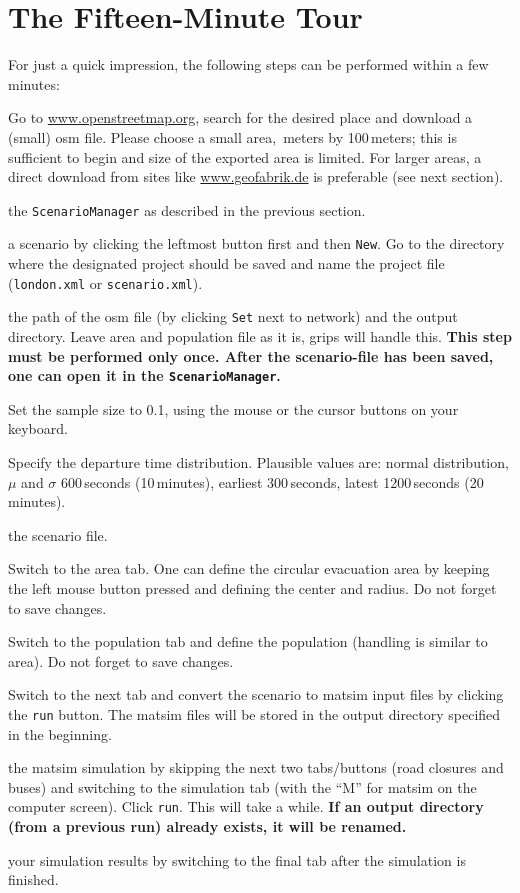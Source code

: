 \section{The Fifteen-Minute Tour}
\label{evac:section:fifteenminute}
For just a quick impression, the following steps can be performed within a few minutes:
\begin{description}\styleDescription
\item[OSM] Go to \url{www.openstreetmap.org}, search for the desired place and download a (small) \gls{osm} file. Please choose a small area, \,meters by 100\,meters; this is sufficient to begin and size of the exported area is limited. For larger areas, a direct download from sites like \url{www.geofabrik.de} is preferable (see next section).
\item[Run] the \lstinline|ScenarioManager| as described in the previous section.
\item[Create] a scenario by clicking the leftmost button first and then \lstinline|New|. Go to the directory where the designated project should be saved and name the project file (\eg \lstinline|london.xml| or \lstinline|scenario.xml|).
\item[Specify] the path of the \gls{osm} file (by clicking \lstinline|Set| next to network) and the output directory. Leave area and population file as it is, \gls{grips} will handle this.
\textbf{This step must be performed only once. After the scenario-file has been saved, one can open it in the \lstinline|ScenarioManager|.}
\item[Sample size] Set the sample size to 0.1, using the mouse or the cursor buttons on your keyboard.
\item[Departure] Specify the departure time distribution. Plausible values are: normal distribution, $\mu$ and $\sigma$ 600\,seconds (10\,minutes), earliest 300\,seconds, latest 1200\,seconds (20\,minutes).
\item[Save] the scenario file.
\item[Area] Switch to the area tab. One can define the circular evacuation area by keeping the left mouse button pressed and defining the center and radius. Do not forget to save changes.
\item[Population] Switch to the population tab and define the population (handling is similar to area). Do not forget to save changes.
\item[Convert] Switch to the next tab and convert the scenario to \gls{matsim} input files by clicking the \lstinline|run| button. The \gls{matsim} files will be stored in the output directory specified in the beginning.
\item[Run] the \gls{matsim} simulation by skipping the next two tabs/buttons (road closures and buses) and switching to the simulation tab (with the 
 ``M'' for \gls{matsim} on the computer screen). Click \lstinline|run|. This will take a while.
\textbf{If an output directory (\eg from a previous run) already exists, it will be renamed.}
\item[Analyze] your simulation results by switching to the final tab after the simulation is finished.

\end{description}

